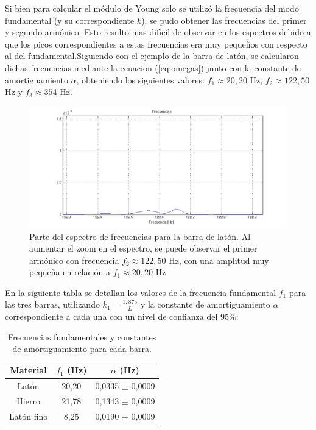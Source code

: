 \documentclass[twoside,twocolumn,a4paper]{article}
\begin{document}
Si bien para calcular el m\'odulo de Young solo se utiliz\'o la frecuencia del modo fundamental (y su correspondiente $k$), se pudo obtener las frecuencias del primer y segundo arm\'onico. Esto resulto mas dif\'icil de observar en los espectros debido a que los picos correspondientes a estas frecuencias era muy peque\~nos con respecto al del fundamental.\newline Siguiendo con el ejemplo de la barra de lat\'on, se calcularon dichas frecuencias mediante la ecuacion (\ref{eq:omegas}) junto con la constante de amortiguamiento $\alpha$, obteniendo los siguientes valores: $f_{1} \approx 20,20$ Hz, $f_{2} \approx 122,50$ Hz y $f_{3} \approx 354$ Hz. \newline

\begin{figure}[H]
\includegraphics[width=\linewidth]{espectrolatonarmonico.jpg}
\caption{Parte del espectro de frecuencias para la barra de lat\'on. Al aumentar el zoom en el espectro, se puede observar el primer arm\'onico con frecuencia $f_{2} \approx 122,50$ Hz, con una amplitud muy peque\~na en relaci\'on a $f_{1} \approx 20,20$ Hz}
\label{fig:espectrolatonarmonico}
\end{figure}


En la siguiente tabla se detallan los valores de la frecuencia fundamental $f_{1}$ para las tres barras, utilizando $k_{1} = \frac{1,875}{L}$ y la constante de amortiguamiento $\alpha$ correspondiente a cada una con un nivel de confianza del 95\%:


\begin{table}[H]
\centering
\caption{Frecuencias fundamentales y constantes de amortiguamiento para cada barra.}
\label{tab:fya_barras}
\begin{tabular}{|c|c|c|}
\hline
Material & $f_{1}$ (Hz) & $\alpha$ (Hz) \\ \hline
Lat\'on & 20,20 & 0,0335 $\pm$ 0,0009\\ \hline
Hierro & 21,78 & 0,1343 $\pm$ 0,0009  \\ \hline
Lat\'on fino & 8,25 & 0,0190 $\pm$ 0,0009\\ \hline
\end{tabular}
\end{table}
\end{document}
